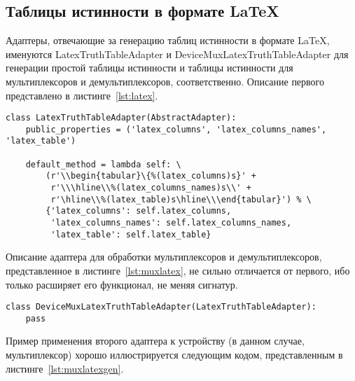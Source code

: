 \documentclass[document.tex]{subfiles}
\begin{document}
\clearpage
\subsection{Таблицы истинности в формате \LaTeX}
Адаптеры, отвечающие за генерацию таблиц истинности в формате \LaTeX, именуются
LatexTruthTableAdapter и DeviceMuxLatexTruthTableAdapter для
генерации простой таблицы истинности и таблицы истинности для мультиплексоров и
демультиплексоров, соответственно. Описание первого
представлено в листинге~\ref{lst:latex}.

\begin{listing}[ht]
\begin{verbatim}
class LatexTruthTableAdapter(AbstractAdapter):
    public_properties = ('latex_columns', 'latex_columns_names', 'latex_table')

    default_method = lambda self: \
        (r'\\begin{tabular}\{%(latex_columns)s}' +
         r'\\\hline\\%(latex_columns_names)s\\' +
         r'\hline\\%(latex_table)s\hline\\\end{tabular}') % \
        {'latex_columns': self.latex_columns,
         'latex_columns_names': self.latex_columns_names,
         'latex_table': self.latex_table}
\end{verbatim}
\caption{Программное описание класса адаптера \LaTeX}
\label{lst:latex}
\end{listing}

Описание адаптера для обработки мультиплексоров и демультиплексоров,
представленное в листинге~\ref{lst:muxlatex}, не сильно отличается от первого,
ибо только расширяет его функционал, не меняя сигнатур.
\begin{listing}[ht]
\begin{verbatim}
class DeviceMuxLatexTruthTableAdapter(LatexTruthTableAdapter):
    pass
\end{verbatim}
\caption{Программное описание класса адаптера \LaTeX для мультиплексоров}
\label{lst:muxlatex}
\end{listing}

\clearpage

Пример применения второго адаптера к устройству (в данном случае,
мультиплексор) хорошо иллюстрируется следующим кодом, представленным в
листинге~\ref{lst:muxlatexgen}.
\end{document}
